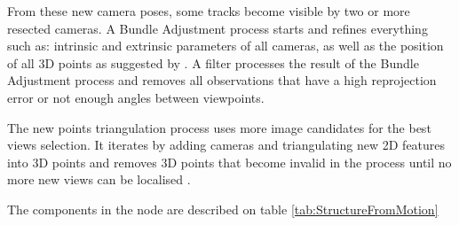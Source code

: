 \documentclass[12pt]{report}
\begin{document}
From these new camera poses, some tracks become visible by two or more resected cameras. A Bundle Adjustment process starts and refines everything such as:
intrinsic and extrinsic parameters of all cameras, as well as the position of all 3D points as suggested by \citet*{Shah2014}. A filter processes the result of the Bundle Adjustment process and removes all observations that have a high reprojection error or not enough angles between viewpoints.

 The new points triangulation process uses more image candidates for the best views selection. It iterates by adding cameras and triangulating new 2D features into 3D points and removes 3D points that become invalid in the process until no more new views can be localised \citep*{Shah2014}.

The components in the node are described on table \ref{tab:StructureFromMotion}
\end{document}
